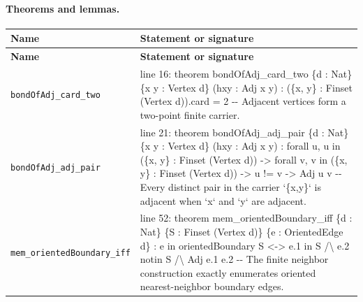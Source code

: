 \documentclass[10pt]{article}
\begin{document}
\paragraph{Theorems and lemmas.}
\begin{longtable}{>{\raggedright\arraybackslash}p{} >{\raggedright\arraybackslash}p{}}
\textbf{Name} & \textbf{Statement or signature} \\
\hline
\endfirsthead
\textbf{Name} & \textbf{Statement or signature} \\
\hline
\endhead
\texttt{bondOfAdj\_\allowbreak{}card\_\allowbreak{}two} & {\ttfamily\scriptsize line 16:\allowbreak{} theorem bondOfAdj\_\allowbreak{}card\_\allowbreak{}two \{d :\allowbreak{} Nat\} \{x y :\allowbreak{} Vertex d\} (\allowbreak{}hxy :\allowbreak{} Adj x y)\allowbreak{} :\allowbreak{} (\allowbreak{}\{x,\allowbreak{} y\} :\allowbreak{} Finset (\allowbreak{}Vertex d)\allowbreak{})\allowbreak{}.\allowbreak{}card =\allowbreak{} 2 -\allowbreak{}-\allowbreak{} Adjacent vertices form a two-\allowbreak{}point finite carrier.\allowbreak{}} \\[0.45em]
\texttt{bondOfAdj\_\allowbreak{}adj\_\allowbreak{}pair} & {\ttfamily\scriptsize line 21:\allowbreak{} theorem bondOfAdj\_\allowbreak{}adj\_\allowbreak{}pair \{d :\allowbreak{} Nat\} \{x y :\allowbreak{} Vertex d\} (\allowbreak{}hxy :\allowbreak{} Adj x y)\allowbreak{} :\allowbreak{} forall u,\allowbreak{} u in (\allowbreak{}\{x,\allowbreak{} y\} :\allowbreak{} Finset (\allowbreak{}Vertex d)\allowbreak{})\allowbreak{} -\allowbreak{}> forall v,\allowbreak{} v in (\allowbreak{}\{x,\allowbreak{} y\} :\allowbreak{} Finset (\allowbreak{}Vertex d)\allowbreak{})\allowbreak{} -\allowbreak{}> u !=\allowbreak{} v -\allowbreak{}> Adj u v -\allowbreak{}-\allowbreak{} Every distinct pair in the carrier `\{x,\allowbreak{}y\}` is adjacent when `x` and `y` are adjacent.\allowbreak{}} \\[0.45em]
\texttt{mem\_\allowbreak{}orientedBoundary\_\allowbreak{}iff} & {\ttfamily\scriptsize line 52:\allowbreak{} theorem mem\_\allowbreak{}orientedBoundary\_\allowbreak{}iff \{d :\allowbreak{} Nat\} \{S :\allowbreak{} Finset (\allowbreak{}Vertex d)\allowbreak{}\} \{e :\allowbreak{} OrientedEdge d\} :\allowbreak{} e in orientedBoundary S <-\allowbreak{}> e.\allowbreak{}1 in S /\allowbreak{}\textbackslash{} e.\allowbreak{}2 notin S /\allowbreak{}\textbackslash{} Adj e.\allowbreak{}1 e.\allowbreak{}2 -\allowbreak{}-\allowbreak{} The finite neighbor construction exactly enumerates oriented nearest-\allowbreak{}neighbor boundary edges.\allowbreak{}} \\[0.45em]

\end{longtable}
\end{document}
